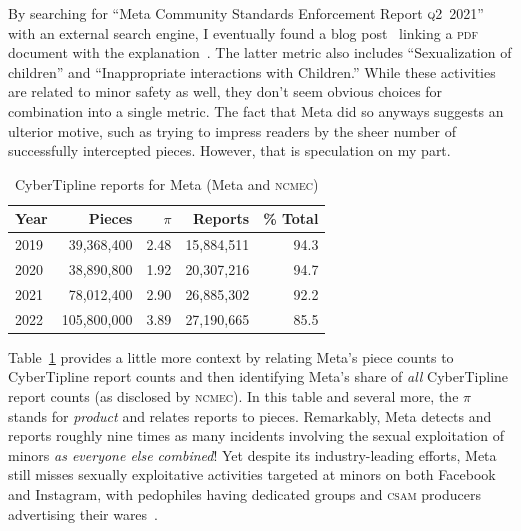 \documentclass[nonacm,screen]{acmart}
\newcommand\V[1]{\textsc{\MakeLowercase{#1}}}
\begin{document}
By searching for ``Meta Community Standards Enforcement Report \V{\V{Q2}}~2021''
with an external search engine, I eventually found a blog
post~\cite{Facebook2021a} linking a \V{PDF} document with the
explanation~\cite{Facebook2021}. The latter metric also includes ``Sexualization
of children'' and ``Inappropriate interactions with Children.'' While these
activities are related to minor safety as well, they don't seem obvious choices
for combination into a single metric. The fact that Meta did so anyways suggests
an ulterior motive, such as trying to impress readers by the sheer number of
successfully intercepted pieces. However, that is speculation on my part.

\begin{table}[h!]
\centering\libertineLF
\caption{CyberTipline reports for Meta (Meta and \V{NCMEC})}
\label{tab:meta-pieces-and-reports}
\begin{tabular}{lrrrr}
\textbf{Year} & \textbf{Pieces} & $\pi$ & \textbf{Reports} & \textbf{\% Total} \\ \hline
2019 & 39,368,400 & 2.48 & 15,884,511 & 94.3 \\
2020 & 38,890,800 & 1.92 & 20,307,216 & 94.7 \\
2021 & 78,012,400 & 2.90 & 26,885,302 & 92.2 \\
2022 & 105,800,000 & 3.89 & 27,190,665 & 85.5 \\
\end{tabular}
\end{table}

Table~\ref{tab:meta-pieces-and-reports} provides a little more context by
relating Meta's piece counts to CyberTipline report counts and then identifying
Meta's share of \emph{all} CyberTipline report counts (as disclosed by
\V{NCMEC}). In this table and several more, the $\pi$ stands for \emph{product}
and relates reports to pieces. Remarkably, Meta detects and reports roughly nine
times as many incidents involving the sexual exploitation of minors \emph{as
everyone else combined}! Yet despite its industry-leading efforts, Meta still
misses sexually exploitative activities targeted at minors on both Facebook and
Instagram, with pedophiles having dedicated groups and \V{CSAM} producers
advertising their wares~\cite{HorwitzBlunt2023,HorwitzBlunt2023a}.
\end{document}
